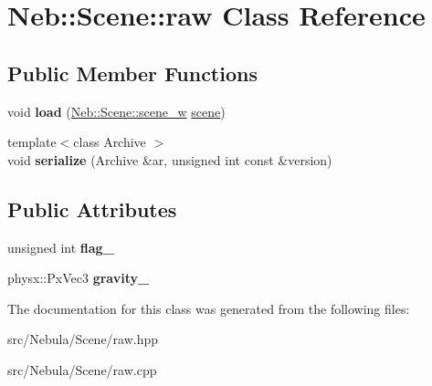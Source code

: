 \hypertarget{classNeb_1_1Scene_1_1raw}{\section{\-Neb\-:\-:\-Scene\-:\-:raw \-Class \-Reference}
\label{classNeb_1_1Scene_1_1raw}
}
\subsection*{\-Public \-Member \-Functions}
\begin{DoxyCompactItemize}
\item 
\hypertarget{classNeb_1_1Scene_1_1raw_a87d3f160fbe609df46948b4a322cc619}{void {\bfseries load} (\hyperlink{classNeb_1_1weak__ptr}{\-Neb\-::\-Scene\-::scene\-\_\-w} \hyperlink{classNeb_1_1Scene_1_1scene}{scene})}\label{classNeb_1_1Scene_1_1raw_a87d3f160fbe609df46948b4a322cc619}

\item 
\hypertarget{classNeb_1_1Scene_1_1raw_a3965f846e20ad78c3ac4c588b483b4b3}{{\footnotesize template$<$class Archive $>$ }\\void {\bfseries serialize} (\-Archive \&ar, unsigned int const \&version)}\label{classNeb_1_1Scene_1_1raw_a3965f846e20ad78c3ac4c588b483b4b3}

\end{DoxyCompactItemize}
\subsection*{\-Public \-Attributes}
\begin{DoxyCompactItemize}
\item 
\hypertarget{classNeb_1_1Scene_1_1raw_a8e58367d90a80af9a19e0bb27f1f1422}{unsigned int {\bfseries flag\-\_\-}}\label{classNeb_1_1Scene_1_1raw_a8e58367d90a80af9a19e0bb27f1f1422}

\item 
\hypertarget{classNeb_1_1Scene_1_1raw_aba6c852bd4e54b9e766a00f08cdb6f4c}{physx\-::\-Px\-Vec3 {\bfseries gravity\-\_\-}}\label{classNeb_1_1Scene_1_1raw_aba6c852bd4e54b9e766a00f08cdb6f4c}

\end{DoxyCompactItemize}


\-The documentation for this class was generated from the following files\-:\begin{DoxyCompactItemize}
\item 
src/\-Nebula/\-Scene/raw.\-hpp\item 
src/\-Nebula/\-Scene/raw.\-cpp\end{DoxyCompactItemize}
